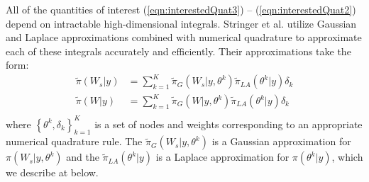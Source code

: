 \documentclass[AMA,STIX1COL,doublespace]{WileyNJD-v2}
\begin{document}
All of the quantities of interest (\ref{eqn:interestedQuat3}) -- (\ref{eqn:interestedQuat2}) depend on intractable high-dimensional integrals. Stringer et al. \cite{casecross} utilize Gaussian and Laplace approximations combined with numerical quadrature to approximate each of these integrals accurately and efficiently. Their approximations take the form:
\begin{equation}\begin{aligned}\label{eqn:integration}
\tilde{\pi}(W_{s}|y) &= \sum_{k=1}^{K}
\tilde{\pi}_{G}(W_{s}|y,\theta^{k})
\tilde{\pi}_{LA}(\theta^{k}|y)\delta_{k} \\
\tilde{\pi}(W|y) &= \sum_{k=1}^{K}
\tilde{\pi}_{G}(W|y,\theta^{k})
\tilde{\pi}_{LA}(\theta^{k}|y)\delta_{k} \\
\end{aligned}\end{equation}
where $\left\{\theta^{k},\delta_{k}\right\}_{k=1}^{K}$ is a set of nodes and weights corresponding to an appropriate numerical quadrature rule. The $\tilde{\pi}_{G}(W_{s}|y,\theta^{k})$ is a Gaussian approximation for $\pi(W_{s}|y,\theta^{k})$ and the $\tilde{\pi}_{LA}(\theta^{k}|y)$ is a Laplace approximation for $\pi(\theta^{k}|y)$, which we describe at below.
\end{document}
